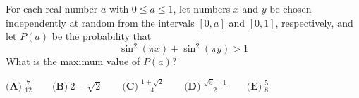 For each real number $a$ with $0 \leq a \leq 1$, let numbers $x$ and $y$ be chosen independently at random from the intervals $[0, a]$ and $[0, 1]$, respectively, and let $P(a)$ be the probability that $$\sin^2{(\pi x)} + \sin^2{(\pi y)} > 1$$ What is the maximum value of $P(a)?$

$\textbf{(A)}\ \frac{7}{12} \qquad\textbf{(B)}\ 2 - \sqrt{2} \qquad\textbf{(C)}\ \frac{1+\sqrt{2}}{4} \qquad\textbf{(D)}\ \frac{\sqrt{5}-1}{2} \qquad\textbf{(E)}\ \frac{5}{8}$